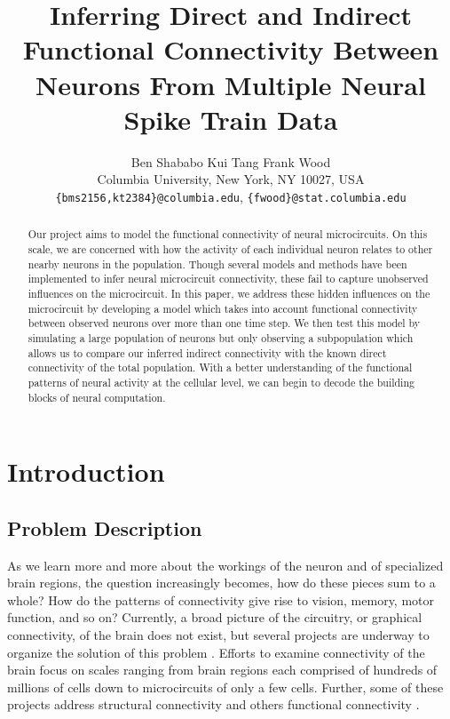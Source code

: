 \documentclass{article}
\title{Inferring Direct and Indirect Functional Connectivity Between Neurons From Multiple Neural Spike Train Data}
\author{
Ben Shababo \hspace{1cm} Kui Tang \hspace{1 cm}Frank Wood\\
Columbia University, New York, NY 10027, USA \\
\texttt{\{bms2156,kt2384\}@columbia.edu},
\texttt{\{fwood\}@stat.columbia.edu} 
}
\begin{document}
\maketitle

\begin{abstract}
Our project aims to model the functional connectivity of neural
microcircuits. On this scale, we are concerned with how the activity
of each individual neuron relates to other nearby neurons in the
population. Though several models and methods have been implemented
to infer neural microcircuit connectivity, these fail to capture
unobserved influences on the microcircuit. In this paper, we address
these hidden influences on the microcircuit by developing a model
which takes into account functional connectivity between observed
neurons over more than one time step. We then test
this model by simulating a large population of neurons but only
observing a subpopulation which allows us to compare our inferred
indirect connectivity with the known direct connectivity of the
total population. With a better understanding of the functional
patterns of neural activity at the cellular level, we can begin to
decode the building blocks of neural computation.
\end{abstract}

\section{Introduction}
\label{sec:introduction}

\subsection{Problem Description}

As we learn more and more about the workings of the neuron and of
specialized brain regions, the question increasingly becomes, how
do these pieces sum to a whole? How do the patterns of connectivity
give rise to vision, memory, motor function, and so on? Currently,
a broad picture of the circuitry, or graphical connectivity, of the
brain does not exist, but several projects are underway to organize
the solution of this problem \citep{Marcus2011, Bohland2009}. Efforts
to examine connectivity of the brain focus on scales ranging from
brain regions each comprised of hundreds of millions of cells down
to microcircuits of only a few cells. Further, some of these projects
address structural connectivity and others functional connectivity
\citep{KnowlesBarley2011, Jain2010, Ropireddy2011, Chiang2011, bhattacharya2006}.
\end{document}
